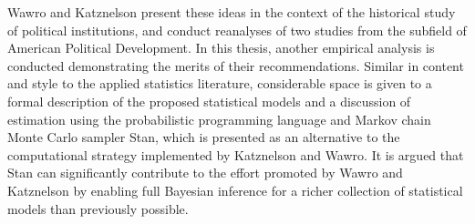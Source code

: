 Wawro and Katznelson present these ideas in the context of the historical study of political 
institutions, and conduct reanalyses of two studies from the subfield of American Political 
Development. In this thesis, another empirical analysis is conducted demonstrating the merits 
of their recommendations. Similar in content and style to the applied statistics literature, 
considerable space is given to a formal description of the proposed statistical models and 
a discussion of estimation using the probabilistic programming 
language and Markov chain Monte Carlo sampler Stan, which is presented as an alternative to 
the computational strategy implemented by Katznelson and Wawro. It is argued that Stan can 
significantly contribute to the effort promoted by Wawro and Katznelson by enabling full Bayesian 
inference for a richer collection of statistical models than previously possible. 



%



